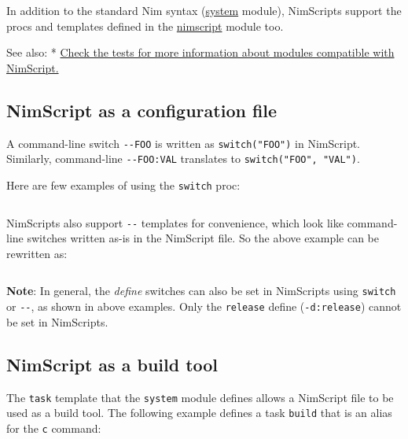 In addition to the standard Nim syntax (\href{system.html}{system}
module), NimScripts support the procs and templates defined in the
\href{nimscript.html}{nimscript} module too.

See also: *
\href{https://github.com/nim-lang/Nim/blob/devel/tests/test_nimscript.nims}{Check
the tests for more information about modules compatible with NimScript.}

\hypertarget{nimscript-as-a-configuration-file}{%
\subsection{NimScript as a configuration
file}\label{nimscript-as-a-configuration-file}}

A command-line switch \texttt{-\/-FOO} is written as
\texttt{switch("FOO")} in NimScript. Similarly, command-line
\texttt{-\/-FOO:VAL} translates to \texttt{switch("FOO",\ "VAL")}.

Here are few examples of using the \texttt{switch} proc:

\begin{verbatim}
\end{verbatim}

NimScripts also support \texttt{-\/-} templates for convenience, which
look like command-line switches written as-is in the NimScript file. So
the above example can be rewritten as:

\begin{verbatim}
\end{verbatim}

\textbf{Note}: In general, the \emph{define} switches can also be set in
NimScripts using \texttt{switch} or \texttt{-\/-}, as shown in above
examples. Only the \texttt{release} define (\texttt{-d:release}) cannot
be set in NimScripts.

\hypertarget{nimscript-as-a-build-tool}{%
\subsection{NimScript as a build tool}\label{nimscript-as-a-build-tool}}

The \texttt{task} template that the \texttt{system} module defines
allows a NimScript file to be used as a build tool. The following
example defines a task \texttt{build} that is an alias for the
\texttt{c} command:

\begin{verbatim}
\end{verbatim}

